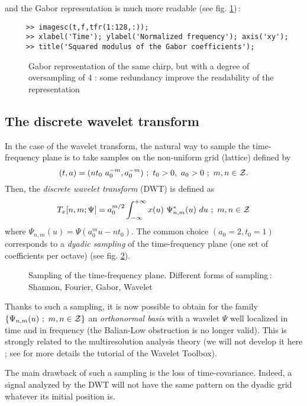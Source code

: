 and the Gabor representation is much more readable (see
fig. \ref{At3fig4})\,: 
\begin{verbatim}
     >> imagesc(t,f,tfr(1:128,:)); 
     >> xlabel('Time'); ylabel('Normalized frequency'); axis('xy'); 
     >> title('Squared modulus of the Gabor coefficients');
\end{verbatim}
\begin{figure}[htb]
\epsfxsize=10cm
\epsfysize=8cm
\centerline{}
\caption{\label{At3fig4}Gabor representation of the same chirp, but with a
degree of oversampling of 4 : some redundancy improve the readability of
the representation}
\end{figure}


\subsection{The discrete wavelet transform}
  In the case of the wavelet transform, the natural way to sample the
time-frequency plane is to take samples on the non-uniform grid (lattice)
defined by
\[{(t,a) = (nt_0\ a_0^{-m},a_0^{-m})\ ;\ t_0>0,\ a_0>0\ ;\ m,n \in
\Zset}.\]  
Then, the {\it discrete wavelet transform} (DWT) is defined as
\[T_x[n,m;\Psi]=a_0^{m/2} \int_{-\infty}^{+\infty} x(u)\ \Psi^*_{n,m}(u)\
du\ ;\ m,n \in {\cal Z}\] where $\Psi_{n,m}(u)=\Psi(a_0^m u-nt_0)$. The
common choice $(a_0=2,t_0=1)$ corresponds to a {\it dyadic sampling}
\index{dyadic sampling} of the time-frequency plane (one set of
coefficients per octave) (see fig. \ref{At3fig5}).
\begin{figure}[htb]
\epsfxsize=10cm
\epsfysize=12cm
\centerline{}
\caption{\label{At3fig5}Sampling of the time-frequency plane. Different
forms of sampling\,: Shannon, Fourier, Gabor, Wavelet}
\end{figure}
Thanks to such a sampling, it is now possible to obtain for the family
$\{\Psi_{n,m}(u)\ ;\ m,n \in {\cal Z}\}$ an {\it orthonormal basis} with a
wavelet $\Psi$ well localized in time and in frequency (the Balian-Low
obstruction is no longer valid). This is strongly related to the
multiresolution analysis theory (we will not develop it here ; see for more
details the tutorial of the Wavelet Toolbox).

  The main drawback of such a sampling is the loss of time-covariance.
Indeed, a signal analyzed by the DWT will not have the same pattern on the
dyadic grid whatever its initial position is.

